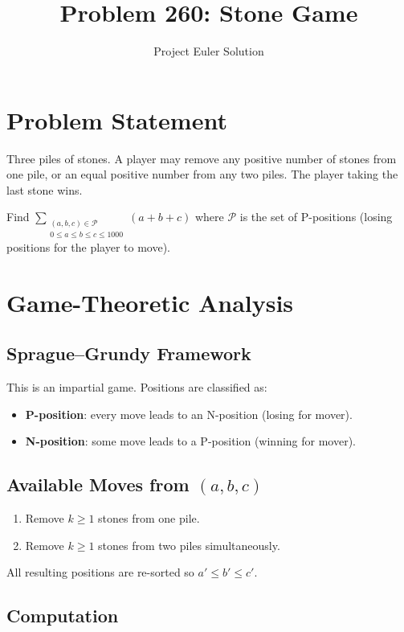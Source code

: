 \documentclass[12pt]{article}
\title{Problem 260: Stone Game}
\author{Project Euler Solution}
\date{}
\begin{document}
\maketitle

\section{Problem Statement}

Three piles of stones. A player may remove any positive number of stones from one pile, or an equal positive number from any two piles. The player taking the last stone wins.

Find $\displaystyle\sum_{\substack{(a,b,c) \in \mathcal{P} \\ 0 \le a \le b \le c \le 1000}} (a+b+c)$ where $\mathcal{P}$ is the set of P-positions (losing positions for the player to move).

\section{Game-Theoretic Analysis}

\subsection{Sprague--Grundy Framework}

This is an impartial game. Positions are classified as:
\begin{itemize}
    \item \textbf{P-position}: every move leads to an N-position (losing for mover).
    \item \textbf{N-position}: some move leads to a P-position (winning for mover).
\end{itemize}

\subsection{Available Moves from $(a,b,c)$}

\begin{enumerate}
    \item Remove $k \ge 1$ stones from one pile.
    \item Remove $k \ge 1$ stones from two piles simultaneously.
\end{enumerate}

All resulting positions are re-sorted so $a' \le b' \le c'$.

\subsection{Computation}
\end{document}
